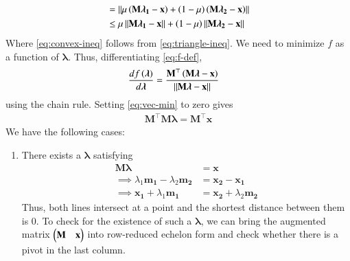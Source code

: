\documentclass[journal,12pt,twocolumn]{IEEEtran}
\renewcommand{\vec}[1]{\boldsymbol{\mathbf{#1}}}
\begin{document}
\begin{enumerate}
\begin{align}
        &= \norm{\mu\brak{\vec{M}\vec{\lambda_1}-\vec{x}}+\brak{1-\mu}\brak{\vec{M}\vec{\lambda_2}-\vec{x}}} \\
        &\le \mu\norm{\vec{M\lambda_1}-\vec{x}} + \brak{1-\mu}\norm{\vec{M\lambda_2}-\vec{x}}
        \label{eq:convex-ineq}
    \end{align}
    Where \eqref{eq:convex-ineq} follows from \eqref{eq:triangle-ineq}.
    We need to minimize $f$ as a function of $\vec{\lambda}$. Thus, differentiating
    \eqref{eq:f-def},
    \begin{align}
    \frac{df\brak{\vec{\lambda}}}{d\vec{\lambda}} &= \frac{\vec{M}^\top\brak{\vec{M\lambda}-\vec{x}}}{\norm{\vec{M\lambda}-\vec{x}}}
        \label{eq:vec-min}
    \end{align}
    using the chain rule. Setting \eqref{eq:vec-min} to zero gives
    \begin{align}
        \vec{M}^\top\vec{M\lambda} = \vec{M}^\top\vec{x}
        \label{eq:vec-eqn}
    \end{align}
    We have the following cases:
    \begin{enumerate}
        \item There exists a $\vec{\lambda}$ satisfying
        \begin{align}
            \vec{M}\vec{\lambda} &= \vec{x} \\
            \implies \lambda_1\vec{m_1} - \lambda_2\vec{m_2} &= \vec{x_2}-\vec{x_1} \\
            \implies \vec{x_1} + \lambda_1\vec{m_1} &= \vec{x_2} + \lambda_2\vec{m_2}
            \label{eq:intersect}
        \end{align}
        Thus, both lines intersect at a point and the shortest
        distance between them is 0. To check for the existence of such a 
        $\vec{\lambda}$, we can bring the augmented matrix 
        $\myvec{\vec{M}&\vec{x}}$ into row-reduced echelon form and check 
        whether there is a pivot in the last column.


\end{enumerate}
\end{enumerate}
\end{document}
